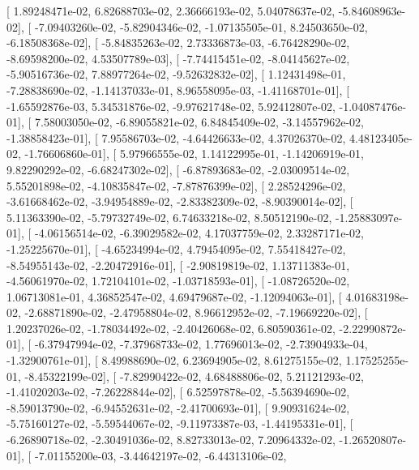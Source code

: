 \documentclass{article}
\begin{document}
       [  1.89248471e-02,   6.82688703e-02,   2.36666193e-02,
          5.04078637e-02,  -5.84608963e-02],
       [ -7.09403260e-02,  -5.82904346e-02,  -1.07135505e-01,
          8.24503650e-02,  -6.18508368e-02],
       [ -5.84835263e-02,   2.73336873e-03,  -6.76428290e-02,
         -8.69598200e-02,   4.53507789e-03],
       [ -7.74415451e-02,  -8.04145627e-02,  -5.90516736e-02,
          7.88977264e-02,  -9.52632832e-02],
       [  1.12431498e-01,  -7.28838690e-02,  -1.14137033e-01,
          8.96558095e-03,  -1.41168701e-01],
       [ -1.65592876e-03,   5.34531876e-02,  -9.97621748e-02,
          5.92412807e-02,  -1.04087476e-01],
       [  7.58003050e-02,  -6.89055821e-02,   6.84845409e-02,
         -3.14557962e-02,  -1.38858423e-01],
       [  7.95586703e-02,  -4.64426633e-02,   4.37026370e-02,
          4.48123405e-02,  -1.76606860e-01],
       [  5.97966555e-02,   1.14122995e-01,  -1.14206919e-01,
          9.82290292e-02,  -6.68247302e-02],
       [ -6.87893683e-02,  -2.03009514e-02,   5.55201898e-02,
         -4.10835847e-02,  -7.87876399e-02],
       [  2.28524296e-02,  -3.61668462e-02,  -3.94954889e-02,
         -2.83382309e-02,  -8.90390014e-02],
       [  5.11363390e-02,  -5.79732749e-02,   6.74633218e-02,
          8.50512190e-02,  -1.25883097e-01],
       [ -4.06156514e-02,  -6.39029582e-02,   4.17037759e-02,
          2.33287171e-02,  -1.25225670e-01],
       [ -4.65234994e-02,   4.79454095e-02,   7.55418427e-02,
         -8.54955143e-02,  -2.20472916e-01],
       [ -2.90819819e-02,   1.13711383e-01,  -4.56061970e-02,
          1.72104101e-02,  -1.03718593e-01],
       [ -1.08726520e-02,   1.06713081e-01,   4.36852547e-02,
          4.69479687e-02,  -1.12094063e-01],
       [  4.01683198e-02,  -2.68871890e-02,  -2.47958804e-02,
          8.96612952e-02,  -7.19669220e-02],
       [  1.20237026e-02,  -1.78034492e-02,  -2.40426068e-02,
          6.80590361e-02,  -2.22990872e-01],
       [ -6.37947994e-02,  -7.37968733e-02,   1.77696013e-02,
         -2.73904933e-04,  -1.32900761e-01],
       [  8.49988690e-02,   6.23694905e-02,   8.61275155e-02,
          1.17525255e-01,  -8.45322199e-02],
       [ -7.82990422e-02,   4.68488806e-02,   5.21121293e-02,
         -1.41020203e-02,  -7.26228844e-02],
       [  6.52597878e-02,  -5.56394690e-02,  -8.59013790e-02,
         -6.94552631e-02,  -2.41700693e-01],
       [  9.90931624e-02,  -5.75160127e-02,  -5.59544067e-02,
         -9.11973387e-03,  -1.44195331e-01],
       [ -6.26890718e-02,  -2.30491036e-02,   8.82733013e-02,
          7.20964332e-02,  -1.26520807e-01],
       [ -7.01155200e-03,  -3.44642197e-02,  -6.44313106e-02,
\end{document}
